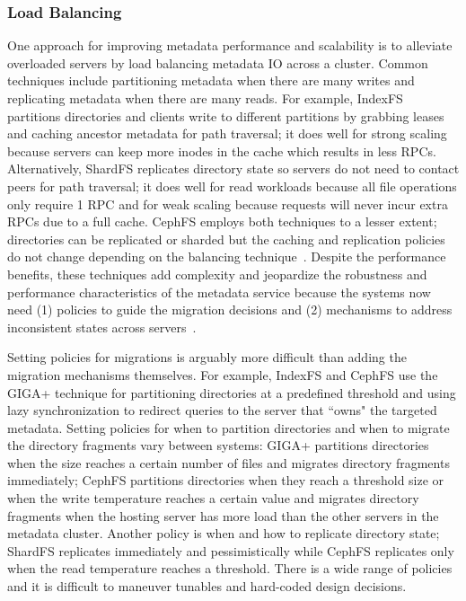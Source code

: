 
\subsubsection{Load Balancing}

One approach for improving metadata performance and scalability is to alleviate
overloaded servers by load balancing metadata IO across a cluster. Common
techniques include partitioning metadata when there are many writes and
replicating metadata when there are many reads. For example, IndexFS partitions
directories and clients write to different partitions by grabbing leases and
caching ancestor metadata for path traversal; it does well for strong scaling
because servers can keep more inodes in the cache which results in less RPCs.
Alternatively, ShardFS replicates directory state so servers do not need to
contact peers for path traversal; it does well for read workloads because all
file operations only require 1 RPC and for weak scaling because requests will
never incur extra RPCs due to a full cache.  CephFS employs both techniques to
a lesser extent; directories can be replicated or sharded but the caching and
replication policies do not change depending on the balancing
technique~\cite{weil:sc2004-dyn-metadata, weil:phdthesis07}.  Despite the
performance benefits, these techniques add complexity and jeopardize the
robustness and performance characteristics of the metadata service because the
systems now need (1) policies to guide the migration decisions and (2)
mechanisms to address inconsistent states across
servers~\cite{sevilla:sc15-mantle}.

Setting policies for migrations is arguably more difficult than adding the
migration mechanisms themselves.  For example, IndexFS and CephFS use the GIGA+
technique for partitioning directories at a predefined threshold and using lazy
synchronization to redirect queries to the server that ``owns" the targeted
metadata.  Setting policies for when to partition directories and when to
migrate the directory fragments vary between systems: GIGA+ partitions
directories when the size reaches a certain number of files and migrates
directory fragments immediately; CephFS partitions directories when they reach
a threshold size or when the write temperature reaches a certain value and
migrates directory fragments when the hosting server has more load than the
other servers in the metadata cluster. Another policy is when and how to
replicate directory state; ShardFS replicates immediately and pessimistically
while CephFS replicates only when the read temperature reaches a threshold.
There is a wide range of policies and it is difficult to maneuver tunables and
hard-coded design decisions.


